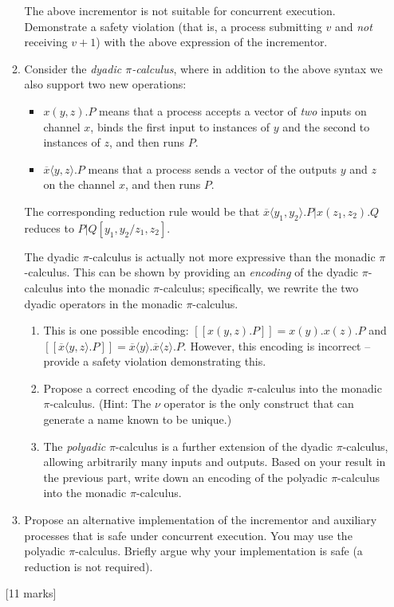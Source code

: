 \documentclass[12pt, a4paper]{article}
\begin{document}
\begin{enumerate}
\begin{enumerate}
The above incrementor is not suitable for concurrent execution. Demonstrate a safety
violation (that is, a process submitting $v$ and \textit{not} receiving $v+1$) 
with the above expression of the incrementor.

\item Consider the \textit{dyadic $\pi$-calculus}, where in addition to the
above syntax we also support two new operations:

\begin{itemize}
\item $x(y, z).P$ means that a process accepts a vector of \textit{two} inputs on 
channel
$x$, binds the first input to instances of $y$ and the second to instances of $z$,
and then runs $P$.
\item $\overline{x} \langle y, z \rangle. P$ means that a process sends a vector of 
the outputs
$y$ and $z$ on the channel $x$, and then runs $P$.
\end{itemize}

The corresponding reduction rule would be that
$\overline{x} \langle y_1, y_2 \rangle. P | x(z_1, z_2). Q$ reduces to 
$P|Q[y_1, y_2/z_1, z_2]$.

The dyadic $\pi$-calculus is actually not more expressive than the monadic
$\pi$-calculus. This can be shown by providing an 
\textit{encoding} of the dyadic $\pi$-calculus into the monadic $\pi$-calculus;
specifically, we rewrite the two dyadic operators in the monadic $\pi$-calculus.

\begin{enumerate}
\item This is one possible encoding: $[[x(y, z).P]] = x(y).x(z).P$ and 
$[[\overline{x} \langle y, z \rangle. P]] = \overline{x} \langle y \rangle. \overline{x} \langle z \rangle. P$. However, this encoding is
incorrect -- provide a safety violation demonstrating this.
\item Propose a correct encoding of the dyadic $\pi$-calculus into the monadic
$\pi$-calculus. (Hint: The $\nu$ operator is the only construct that can generate
a name known to be unique.)
\item The \textit{polyadic} $\pi$-calculus is a further extension of the dyadic
$\pi$-calculus, allowing arbitrarily many inputs and outputs. Based on your result 
in the previous part, write down an encoding of the polyadic $\pi$-calculus into
the monadic $\pi$-calculus.
\end{enumerate}

\item Propose an alternative implementation of the incrementor and auxiliary
processes that is safe under concurrent execution. You may use the polyadic
$\pi$-calculus. Briefly argue why your implementation is safe (a reduction
is not required).
\end{enumerate}
[11 marks]

\end{enumerate}
\end{document}
